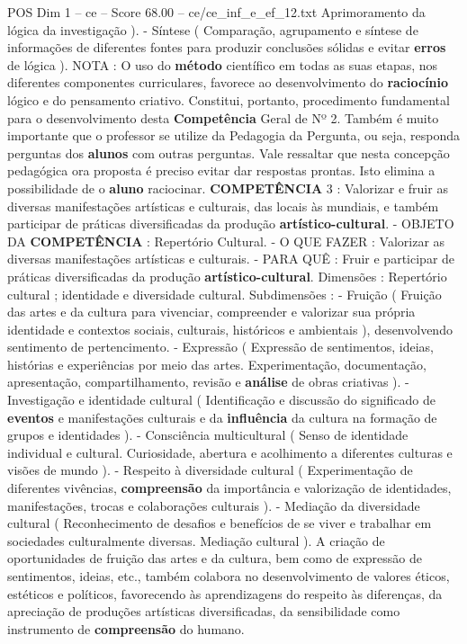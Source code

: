 \begin{textsample}{POS Dim 1 – ce – Score 68.00 – ce/ce\_inf\_e\_ef\_12.txt}
Aprimoramento da lógica da investigação ). - Síntese ( Comparação, agrupamento e síntese de informações de diferentes fontes para produzir conclusões sólidas e evitar \textbf{erros} de lógica ).
NOTA : O uso do \textbf{método} científico em todas as suas etapas, nos diferentes componentes curriculares, favorece ao desenvolvimento do \textbf{raciocínio} lógico e do pensamento criativo.
Constitui, portanto, procedimento fundamental para o desenvolvimento desta \textbf{Competência} Geral de Nº 2.
Também é muito importante que o professor se utilize da Pedagogia da Pergunta, ou seja, responda perguntas dos \textbf{alunos} com outras perguntas.
Vale ressaltar que nesta concepção pedagógica ora proposta é preciso evitar dar respostas prontas.
Isto elimina a possibilidade de o \textbf{aluno} raciocinar. \textbf{COMPETÊNCIA} 3 : Valorizar e fruir as diversas manifestações artísticas e culturais, das locais às mundiais, e também participar de práticas diversificadas da produção \textbf{artístico-cultural}. - OBJETO DA \textbf{COMPETÊNCIA} : Repertório Cultural. - O QUE FAZER : Valorizar as diversas manifestações artísticas e culturais. - PARA QUÊ : Fruir e participar de práticas diversificadas da produção \textbf{artístico-cultural}.
Dimensões : Repertório cultural ; identidade e diversidade cultural.
Subdimensões : - Fruição ( Fruição das artes e da cultura para vivenciar, compreender e valorizar sua própria identidade e contextos sociais, culturais, históricos e ambientais ), desenvolvendo sentimento de pertencimento. - Expressão ( Expressão de sentimentos, ideias, histórias e experiências por meio das artes.
Experimentação, documentação, apresentação, compartilhamento, revisão e \textbf{análise} de obras criativas ). - Investigação e identidade cultural ( Identificação e discussão do significado de \textbf{eventos} e manifestações culturais e da \textbf{influência} da cultura na formação de grupos e identidades ). - Consciência multicultural ( Senso de identidade individual e cultural.
Curiosidade, abertura e acolhimento a diferentes culturas e visões de mundo ). - Respeito à diversidade cultural ( Experimentação de diferentes vivências, \textbf{compreensão} da importância e valorização de identidades, manifestações, trocas e colaborações culturais ). - Mediação da diversidade cultural ( Reconhecimento de desafios e benefícios de se viver e trabalhar em sociedades culturalmente diversas.
Mediação cultural ).
A criação de oportunidades de fruição das artes e da cultura, bem como de expressão de sentimentos, ideias, etc., também colabora no desenvolvimento de valores éticos, estéticos e políticos, favorecendo às aprendizagens do respeito às diferenças, da apreciação de produções artísticas diversificadas, da sensibilidade como instrumento de \textbf{compreensão} do humano.

\end{textsample}
